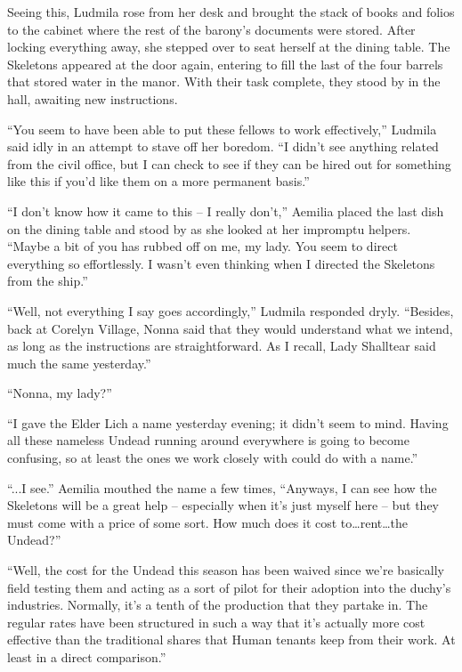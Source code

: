  

Seeing this, Ludmila rose from her desk and brought the stack of books and folios to the cabinet where the rest of the barony’s documents were stored. After locking everything away, she stepped over to seat herself at the dining table. The Skeletons appeared at the door again, entering to fill the last of the four barrels that stored water in the manor. With their task complete, they stood by in the hall, awaiting new instructions.

 

“You seem to have been able to put these fellows to work effectively,” Ludmila said idly in an attempt to stave off her boredom. “I didn’t see anything related from the civil office, but I can check to see if they can be hired out for something like this if you’d like them on a more permanent basis.”

 

“I don’t know how it came to this – I really don’t,” Aemilia placed the last dish on the dining table and stood by as she looked at her impromptu helpers. “Maybe a bit of you has rubbed off on me, my lady. You seem to direct everything so effortlessly. I wasn’t even thinking when I directed the Skeletons from the ship.”

 

“Well, not everything I say goes accordingly,” Ludmila responded dryly. “Besides, back at Corelyn Village, Nonna said that they would understand what we intend, as long as the instructions are straightforward. As I recall, Lady Shalltear said much the same yesterday.”

 

“Nonna, my lady?”

 

“I gave the Elder Lich a name yesterday evening; it didn’t seem to mind. Having all these nameless Undead running around everywhere is going to become confusing, so at least the ones we work closely with could do with a name.”

 

“...I see.” Aemilia mouthed the name a few times, “Anyways, I can see how the Skeletons will be a great help – especially when it’s just myself here – but they must come with a price of some sort. How much does it cost to…rent…the Undead?”

 

“Well, the cost for the Undead this season has been waived since we’re basically field testing them and acting as a sort of pilot for their adoption into the duchy’s industries. Normally, it’s a tenth of the production that they partake in. The regular rates have been structured in such a way that it’s actually more cost effective than the traditional shares that Human tenants keep from their work. At least in a direct comparison.”

